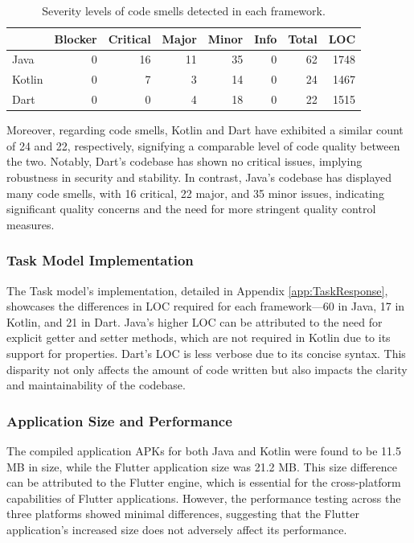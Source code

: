 \begin{table}[htbp]
	\begin{tabular}{l|r|r|r|r|r|r|r}
		\hline
        \cellcolor{Gray} & \cellcolor{Gray}Blocker & \cellcolor{Gray} Critical & \cellcolor{Gray} Major& \cellcolor{Gray}Minor& \cellcolor{Gray}Info & \cellcolor{Gray}Total& \cellcolor{Gray}LOC\\
        \hline
        \cellcolor{Gray} Java    & 0 & 16 & 11 & 35 & 0 & 62 & 1748 \\
        \cellcolor{Gray}Kotlin  & 0 & 7 & 3 & 14 & 0 & 24 & 1467 \\
        \cellcolor{Gray}Dart & 0 & 0 & 4 & 18 & 0 & 22 & 1515 \\
    
    \end{tabular}
	\caption{Severity levels of code smells detected in each framework. \label{tab:kanban}}
\end{table}
\par
Moreover, regarding code smells, Kotlin and Dart have exhibited a similar count of 24 and 22, respectively, signifying a comparable level of code quality between the two. Notably, Dart's codebase has shown no critical issues, implying robustness in security and stability. In contrast, Java's codebase has displayed many code smells, with 16 critical, 22 major, and 35 minor issues, indicating significant quality concerns and the need for more stringent quality control measures.
\subsubsection{Task Model Implementation}
The Task model's implementation, detailed in Appendix \ref*{app:TaskResponse}, showcases the differences in LOC required for each framework—60 in Java, 17 in Kotlin, and 21 in Dart. Java's higher LOC can be attributed to the need for explicit getter and setter methods, which are not required in Kotlin due to its support for properties. Dart's LOC is less verbose due to its concise syntax. This disparity not only affects the amount of code written but also impacts the clarity and maintainability of the codebase.
\subsubsection{Application Size and Performance}
The compiled application APKs for both Java and Kotlin were found to be 11.5 MB in size, while the Flutter application size was 21.2 MB. This size difference can be attributed to the Flutter engine, which is essential for the cross-platform capabilities of Flutter applications. However, the performance testing across the three platforms showed minimal differences, suggesting that the Flutter application's increased size does not adversely affect its performance.
